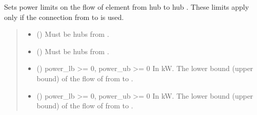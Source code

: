 \documentclass[letterpaper,10pt,english]{sphinxmanual}
\begin{document}
\begin{fulllineitems}
\begin{fulllineitems}
\label{\detokenize{generated/tamos.network.NonThermalNetwork:tamos.network.NonThermalNetwork.set_connection_power_bounds}}
\pysigstartsignatures
{}
\pysigstopsignatures
\sphinxAtStartPar
Sets power limits on the flow of element from hub  to hub .
These limits apply only if the connection from  to  is used.
\begin{quote}\begin{description}
\begin{itemize}
\item {} 
\sphinxAtStartPar
{} ({\hyperref[\detokenize{generated/tamos.Hub:tamos.Hub}]{}}) \textendash{} Must be hubs from .

\item {} 
\sphinxAtStartPar
{} ({\hyperref[\detokenize{generated/tamos.Hub:tamos.Hub}]{}}) \textendash{} Must be hubs from .

\item {} 
\sphinxAtStartPar
{} (\sphinxstyleliteralemphasis{\sphinxupquote{, }}) \textendash{} power\_lb \textgreater{}= 0, power\_ub \textgreater{}= 0
In kW.
The lower bound (upper bound) of the flow of  from  to .

\item {} 
\sphinxAtStartPar
{} (\sphinxstyleliteralemphasis{\sphinxupquote{, }}) \textendash{} power\_lb \textgreater{}= 0, power\_ub \textgreater{}= 0
In kW.
The lower bound (upper bound) of the flow of  from  to .


\end{itemize}
\end{description}
\end{quote}
\end{fulllineitems}
\end{fulllineitems}
\end{document}
